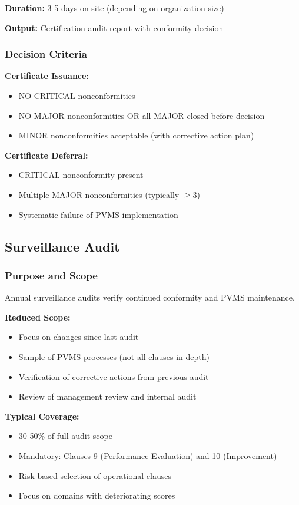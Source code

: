 \documentclass[11pt,a4paper]{article}
\begin{document}
\textbf{Duration:} 3-5 days on-site (depending on organization size)

\textbf{Output:} Certification audit report with conformity decision

\subsubsection{Decision Criteria}

\textbf{Certificate Issuance:}
\begin{itemize}
\item NO CRITICAL nonconformities
\item NO MAJOR nonconformities OR all MAJOR closed before decision
\item MINOR nonconformities acceptable (with corrective action plan)
\end{itemize}

\textbf{Certificate Deferral:}
\begin{itemize}
\item CRITICAL nonconformity present
\item Multiple MAJOR nonconformities (typically $\geq$3)
\item Systematic failure of PVMS implementation
\end{itemize}

\subsection{Surveillance Audit}

\subsubsection{Purpose and Scope}

Annual surveillance audits verify continued conformity and PVMS maintenance.

\textbf{Reduced Scope:}
\begin{itemize}
\item Focus on changes since last audit
\item Sample of PVMS processes (not all clauses in depth)
\item Verification of corrective actions from previous audit
\item Review of management review and internal audit
\end{itemize}

\textbf{Typical Coverage:}
\begin{itemize}
\item 30-50\% of full audit scope
\item Mandatory: Clauses 9 (Performance Evaluation) and 10 (Improvement)
\item Risk-based selection of operational clauses
\item Focus on domains with deteriorating scores
\end{itemize}
\end{document}
